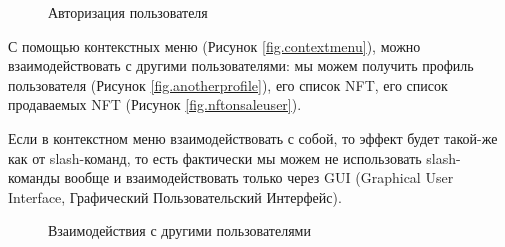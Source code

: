 \begin{figure}
    \centering
    \caption{Авторизация пользователя}
\end{figure}

С помощью контекстных меню (Рисунок {\color{blue} \ref{fig.contextmenu}}), можно взаимодействовать с другими пользователями: мы можем получить профиль пользователя (Рисунок {\color{blue} \ref{fig.anotherprofile}}), его список NFT, его список продаваемых NFT (Рисунок {\color{blue} \ref{fig.nftonsaleuser}}).

\begin{remark}
    Если в контекстном меню взаимодействовать с собой, то эффект будет такой-же как от slash-команд, то есть фактически мы можем не использовать slash-команды вообще и взаимодействовать только через GUI (Graphical User Interface, Графический Пользовательский Интерфейс).
\end{remark}

\begin{figure}
    \centering
    \caption{Взаимодействия с другими пользователями}
\end{figure}

